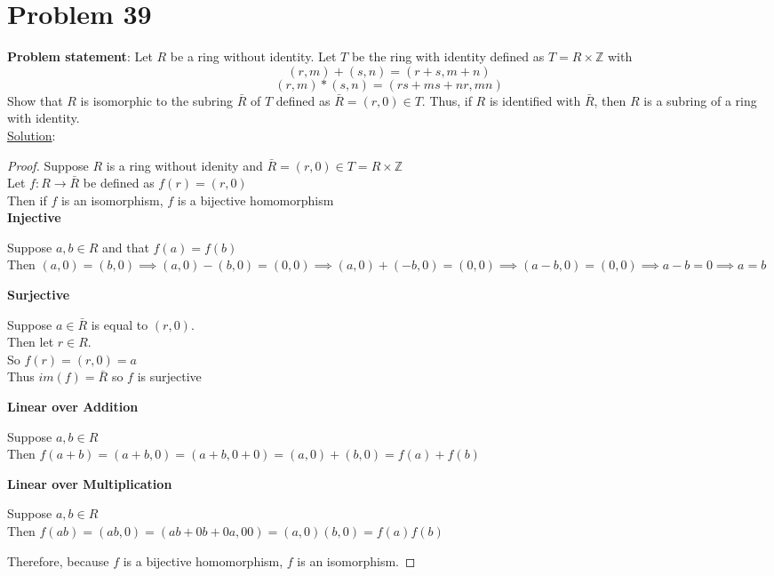 \documentclass{article} %
\begin{document}
\newpage

\section*{Problem 39}

\textbf{Problem statement}: Let $R$ be a ring without identity.  Let $T$ be the ring with identity defined as $T = R \times \mathbb{Z}$ with \[(r,m) + (s,n) = (r + s, m + n)\] \[(r,m)*(s,n) = (rs + ms + nr, mn)\] Show that $R$ is isomorphic to the subring $\bar{R}$ of $T$ defined as $\bar{R} = (r, 0) \in T$.  Thus, if $R$ is identified with $\bar{R}$, then $R$ is a subring of a ring with identity.
\\

\underline{Solution}: 
\begin{addmargin}[1em]{0em}
\begin{proof}
Suppose $R$ is a ring without idenity and $\bar{R} = (r,0) \in T = R \times \mathbb{Z}$
\\Let $f:R \rightarrow \bar{R}$ be defined as $f(r) = (r, 0)$
\\Then if $f$ is an isomorphism, $f$ is a bijective homomorphism
\\ \textbf{Injective}
\begin{addmargin}[1em]{0em}
Suppose $a, b \in R$ and that $f(a) = f(b)$
\\Then $(a,0) = (b,0) \implies (a,0) - (b,0) = (0,0) \implies (a,0) + (-b, 0) = (0,0) \implies (a - b, 0) = (0,0) \implies a-b = 0 \implies a = b$
\end{addmargin}
\textbf{Surjective}
\begin{addmargin}[1em]{0em}
Suppose $a \in \bar{R}$ is equal to $(r,0)$.
\\Then let $r \in R$.
\\So $f(r) = (r,0) = a$
\\Thus $im(f) = \bar{R}$ so $f$ is surjective
\end{addmargin}
\textbf{Linear over Addition}
\begin{addmargin}[1em]{0em}
Suppose $a, b \in R$
\\Then $f(a + b) = (a + b, 0) = (a + b, 0 + 0) = (a, 0) + (b, 0) = f(a) + f(b)$
\end{addmargin}
\textbf{Linear over Multiplication}
\begin{addmargin}[1em]{0em}
Suppose $a, b \in R$
\\Then $f(ab) = (ab, 0) = (ab + 0b + 0a, 00) = (a,0)(b,0) = f(a)f(b)$
\end{addmargin}
Therefore, because $f$ is a bijective homomorphism, $f$ is an isomorphism.
\end{proof}
\end{addmargin}

\newpage
\end{document}
